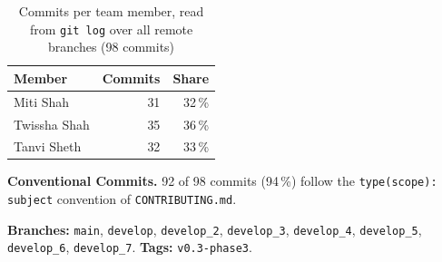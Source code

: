 \begin{table}[htbp]
\caption{Commits per team member, read from \texttt{git log} over all remote branches (98 commits)}
\label{tab:commits}
\small
\begin{tabular}{@{}lrr@{}}
\toprule
\textbf{Member} & \textbf{Commits} & \textbf{Share}\\ \midrule
Miti Shah & 31 & 32\,\%\\
Twissha Shah & 35 & 36\,\%\\
Tanvi Sheth & 32 & 33\,\%\\
\bottomrule
\end{tabular}
\end{table}
\textbf{Conventional Commits.} 92 of 98 commits (94\,\%) follow the \texttt{type(scope): subject} convention of \texttt{CONTRIBUTING.md}.

\textbf{Branches:} \texttt{main}, \texttt{develop}, \texttt{develop\_2}, \texttt{develop\_3}, \texttt{develop\_4}, \texttt{develop\_5}, \texttt{develop\_6}, \texttt{develop\_7}. \textbf{Tags:} \texttt{v0.3-phase3}.

